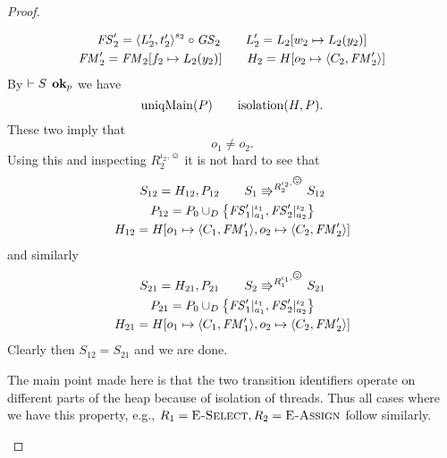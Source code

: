 \begin{proof}
\begin{description}
\begin{equation}
\begin{gathered}
          \mathit{FS}'_2 = \mbox{$\langle L'_2, t'_2 \rangle$}^{s_2} \circ \mathit{GS}_2  \quad\quad L'_2 = L_2[w_2 \mapsto
          L_2(y_2)] \\
          \mathit{FM}'_2 = \mathit{FM}_2[f_2 \mapsto L_2(y_2)] \quad\quad H_2 = H[o_2 \mapsto
          \mbox{$\langle C_2, \mathit{FM}'_2 \rangle$}]
          \\
        \end{gathered}
      \end{equation}
      By $\vdash S \:\: \mbox{{\bf ok}$_p$}$ we have
      \begin{equation}
        \mbox{$\mathrm{uniqMain}$}(P) \quad\quad \mbox{$\mathrm{isolation}$}(H, P).
      \end{equation}
      These two imply that
      \begin{equation}
        o_1 \neq o_2.
      \end{equation}
      Using this and inspecting $R_2^{\iota_2, \smiley}$ it is not hard to see
      that 
      \begin{equation}
        \begin{gathered}
          S_{12} = H_{12}, P_{12} \andalso S_1 \Rrightarrow^{R_2^{\iota_2,
          \smiley}} S_{12}
          \\
          P_{12} = P_0 \cup_D \left\{ \FS'_1|_{a_1}^{\iota_1},
          \FS'_2|_{a_2}^{\iota_2} \right\} \\
          H_{12} = H[o_1 \mapsto \Obj{C_1, \FM'_1}, o_2 \mapsto \Obj{C_2, \FM'_2}]
        \end{gathered}
      \end{equation}
      and similarly 
      \begin{equation}
        \begin{gathered}
          S_{21} = H_{21}, P_{21} \andalso S_2 \Rrightarrow^{R_1^{\iota_1,
          \smiley}} S_{21}
          \\
          P_{21} = P_0 \cup_D \left\{ \FS'_1|_{a_1}^{\iota_1},
          \FS'_2|_{a_2}^{\iota_2} \right\} \\
          H_{21} = H[o_1 \mapsto \Obj{C_1, \FM'_1}, o_2 \mapsto \Obj{C_2, \FM'_2}]
        \end{gathered}
      \end{equation}
      Clearly then $S_{12} = S_{21}$ and we are done.
      \begin{remark}
        The main point made here is that the two transition identifiers operate
        on different parts of the heap because of isolation of threads. Thus all
        cases where we have this property, e.g., $R_1 = \mbox{{\sc E-Select}}, R_2 =
        \mbox{{\sc E-Assign}}$ follow similarly.
      \end{remark}

\end{description}
\end{proof}
